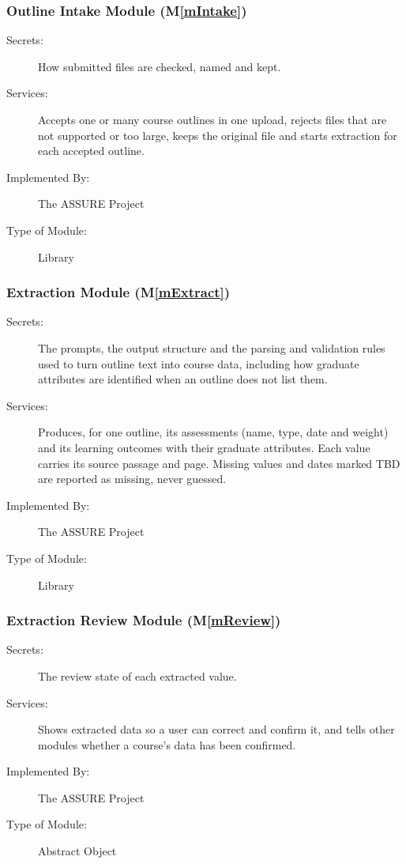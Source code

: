 \documentclass[12pt, titlepage]{article}
\newcommand{\sysname}{The ASSURE Project}
\newcommand{\mref}[1]{M\ref{#1}}
\begin{document}
\subsubsection{Outline Intake Module (\mref{mIntake})} \label{SecMD-mIntake}

\begin{description}
\item[Secrets:] How submitted files are checked, named and kept.
\item[Services:] Accepts one or many course outlines in one upload, rejects
  files that are not supported or too large, keeps the original file and starts
  extraction for each accepted outline.
\item[Implemented By:] \sysname
\item[Type of Module:] Library
\end{description}

\subsubsection{Extraction Module (\mref{mExtract})}

\begin{description}
\item[Secrets:] The prompts, the output structure and the parsing and
  validation rules used to turn outline text into course data, including how
  graduate attributes are identified when an outline does not list them.
\item[Services:] Produces, for one outline, its assessments (name, type, date
  and weight) and its learning outcomes with their graduate attributes. Each
  value carries its source passage and page. Missing values and dates marked TBD
  are reported as missing, never guessed.
\item[Implemented By:] \sysname
\item[Type of Module:] Library
\end{description}

\subsubsection{Extraction Review Module (\mref{mReview})}

\begin{description}
\item[Secrets:] The review state of each extracted value.
\item[Services:] Shows extracted data so a user can correct and confirm it,
  and tells other modules whether a course's data has been confirmed.
\item[Implemented By:] \sysname
\item[Type of Module:] Abstract Object
\end{description}
\end{document}
